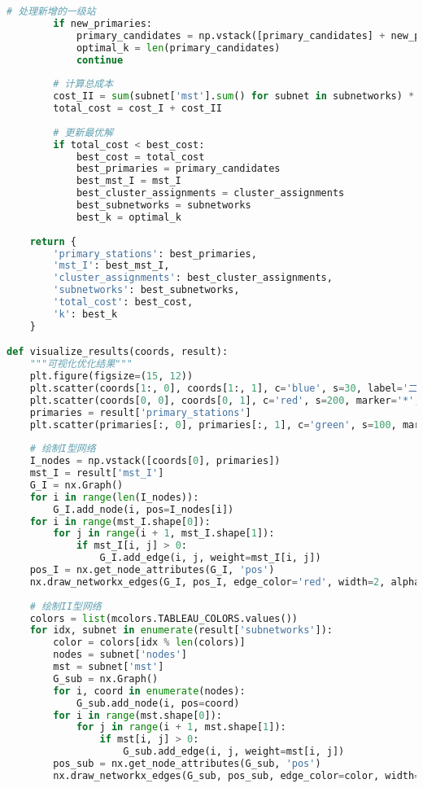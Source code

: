 \documentclass[12pt,a4paper]{article}
\begin{document}
\begin{lstlisting}[language=Python]
        # 处理新增的一级站
        if new_primaries:
            primary_candidates = np.vstack([primary_candidates] + new_primaries)
            optimal_k = len(primary_candidates)
            continue
        
        # 计算总成本
        cost_II = sum(subnet['mst'].sum() for subnet in subnetworks) * c_II
        total_cost = cost_I + cost_II
        
        # 更新最优解
        if total_cost < best_cost:
            best_cost = total_cost
            best_primaries = primary_candidates
            best_mst_I = mst_I
            best_cluster_assignments = cluster_assignments
            best_subnetworks = subnetworks
            best_k = optimal_k
    
    return {
        'primary_stations': best_primaries,
        'mst_I': best_mst_I,
        'cluster_assignments': best_cluster_assignments,
        'subnetworks': best_subnetworks,
        'total_cost': best_cost,
        'k': best_k
    }

def visualize_results(coords, result):
    """可视化优化结果"""
    plt.figure(figsize=(15, 12))
    plt.scatter(coords[1:, 0], coords[1:, 1], c='blue', s=30, label='二级站', alpha=0.6)
    plt.scatter(coords[0, 0], coords[0, 1], c='red', s=200, marker='*', label='中心站')
    primaries = result['primary_stations']
    plt.scatter(primaries[:, 0], primaries[:, 1], c='green', s=100, marker='s', label='一级站')
    
    # 绘制I型网络
    I_nodes = np.vstack([coords[0], primaries])
    mst_I = result['mst_I']
    G_I = nx.Graph()
    for i in range(len(I_nodes)):
        G_I.add_node(i, pos=I_nodes[i])
    for i in range(mst_I.shape[0]):
        for j in range(i + 1, mst_I.shape[1]):
            if mst_I[i, j] > 0:
                G_I.add_edge(i, j, weight=mst_I[i, j])
    pos_I = nx.get_node_attributes(G_I, 'pos')
    nx.draw_networkx_edges(G_I, pos_I, edge_color='red', width=2, alpha=0.8)
    
    # 绘制II型网络
    colors = list(mcolors.TABLEAU_COLORS.values())
    for idx, subnet in enumerate(result['subnetworks']):
        color = colors[idx % len(colors)]
        nodes = subnet['nodes']
        mst = subnet['mst']
        G_sub = nx.Graph()
        for i, coord in enumerate(nodes):
            G_sub.add_node(i, pos=coord)
        for i in range(mst.shape[0]):
            for j in range(i + 1, mst.shape[1]):
                if mst[i, j] > 0:
                    G_sub.add_edge(i, j, weight=mst[i, j])
        pos_sub = nx.get_node_attributes(G_sub, 'pos')
        nx.draw_networkx_edges(G_sub, pos_sub, edge_color=color, width=1.5, alpha=0.6)
    

\end{lstlisting}
\end{document}
